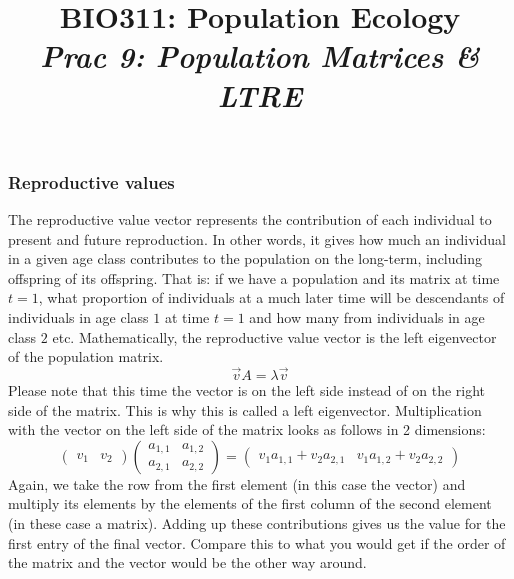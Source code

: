 \documentclass{article}\usepackage[]{graphicx}\usepackage[]{color}
\title{BIO311: Population Ecology\\ \textit{Prac 9: Population Matrices \& LTRE}}
\begin{document}




\maketitle
\tableofcontents
\vspace{3cm}
\newpage

\subsubsection{Reproductive values}
The reproductive value vector represents the contribution of each individual to present and future reproduction. In other words, it gives how much an individual in a given age class contributes to the population on the long-term, including offspring of its offspring. That is: if we have a population and its matrix at time $t=1$, what proportion of individuals at a much later time will be descendants of individuals in age class $1$ at time $t=1$ and how many from individuals in age class $2$ etc. Mathematically, the reproductive value vector is the left eigenvector of the population matrix.
\begin{equation}
\vec{v}A=\lambda \vec{v}
\end{equation}
Please note that this time the vector is on the left side instead of on the right side of the matrix. This is why this is called a left eigenvector. Multiplication with the vector on the left side of the matrix looks as follows in 2 dimensions:
\begin{equation}
\begin{pmatrix} v_1 & v_2 \end{pmatrix} \begin{pmatrix} a_{1,1} & a_{1,2}\\ a_{2,1} & a_{2,2} \end{pmatrix} = \begin{pmatrix} v_1 a_{1,1} + v_2 a_{2,1} & v_1 a_{1,2} + v_2 a_{2,2} \end{pmatrix}
\end{equation}
Again, we take the row from the first element (in this case the vector) and multiply its elements by the elements of the first column of the second element (in these case a matrix). Adding up these contributions gives us the value for the first entry of the final vector. Compare this to what you would get if the order of the matrix and the vector would be the other way around.
\end{document}
